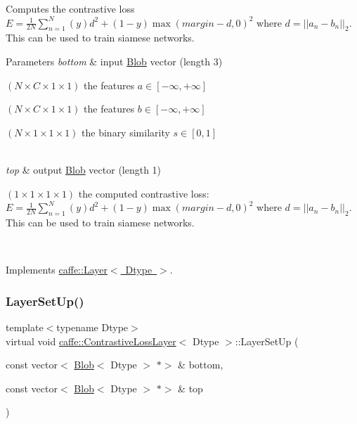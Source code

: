 Computes the contrastive loss $ E = \frac{1}{2N} \sum\limits_{n=1}^N \left(y\right) d^2 + \left(1-y\right) \max \left(margin-d, 0\right)^2 $ where $ d = \left| \left| a_n - b_n \right| \right|_2 $. This can be used to train siamese networks. 


\begin{DoxyParams}{Parameters}
{\em bottom} & input \mbox{\hyperlink{classcaffe_1_1_blob}{Blob}} vector (length 3)
\begin{DoxyEnumerate}
\item $ (N \times C \times 1 \times 1) $ the features $ a \in [-\infty, +\infty]$
\item $ (N \times C \times 1 \times 1) $ the features $ b \in [-\infty, +\infty]$
\item $ (N \times 1 \times 1 \times 1) $ the binary similarity $ s \in [0, 1]$ 
\end{DoxyEnumerate}\\
\hline
{\em top} & output \mbox{\hyperlink{classcaffe_1_1_blob}{Blob}} vector (length 1)
\begin{DoxyEnumerate}
\item $ (1 \times 1 \times 1 \times 1) $ the computed contrastive loss\+: $ E = \frac{1}{2N} \sum\limits_{n=1}^N \left(y\right) d^2 + \left(1-y\right) \max \left(margin-d, 0\right)^2 $ where $ d = \left| \left| a_n - b_n \right| \right|_2 $. This can be used to train siamese networks. 
\end{DoxyEnumerate}\\
\hline
\end{DoxyParams}


Implements \mbox{\hyperlink{classcaffe_1_1_layer_a576ac6a60b1e99fe383831f52a6cea77}{caffe\+::\+Layer$<$ Dtype $>$}}.

\mbox{\label{classcaffe_1_1_contrastive_loss_layer_a957623c05cb2289cd2ae9e9e93b48969}} 
\subsubsection{\texorpdfstring{Layer\+Set\+Up()}{LayerSetUp()}\hspace{0.1cm}{\footnotesize\ttfamily [1/2]}}
{\footnotesize\ttfamily template$<$typename Dtype$>$ \\
virtual void \mbox{\hyperlink{classcaffe_1_1_contrastive_loss_layer}{caffe\+::\+Contrastive\+Loss\+Layer}}$<$ Dtype $>$\+::Layer\+Set\+Up (\begin{DoxyParamCaption}\item[{const vector$<$ \mbox{\hyperlink{classcaffe_1_1_blob}{Blob}}$<$ Dtype $>$ $\ast$$>$ \&}]{bottom,  }\item[{const vector$<$ \mbox{\hyperlink{classcaffe_1_1_blob}{Blob}}$<$ Dtype $>$ $\ast$$>$ \&}]{top }\end{DoxyParamCaption})\hspace{0.3cm}{\ttfamily [virtual]}}



